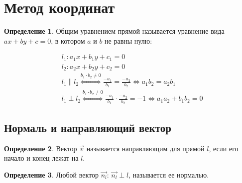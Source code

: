 \documentclass[12pt]{article}
\theoremstyle{definition}
\newtheorem{definition}{Определение}
\begin{document}
    \section{Метод координат}

    \begin{definition}
        Общим уравнением прямой называется уравнение вида $ax+by+c=0$, в котором $a$ и $b$ не равны нулю:

        \begin{align*}
            &l_1:a_1x+b_1y+c_1=0\\
            &l_2:a_2x+b_2y+c_2=0\\
            &l_1\|l_2 \overset{b_1\cdot b_2\neq 0}{\Longleftrightarrow} \frac{-a_1}{b_1}=\frac{-a_2}{b_2}\Longleftrightarrow a_1b_2=a_2b_1\\
            &l_1\perp l_2 \overset{b_1\cdot b_2\neq 0}{\Longleftrightarrow} \frac{-a_1}{b_1}\cdot \frac{-a_2}{b_2}=-1 \Longleftrightarrow a_1a_2+b_1b_2=0
        \end{align*}
    \end{definition}

    \subsection{Нормаль и направляющий вектор}

    \begin{definition}
        Вектор $\Vec{\textit{v}}$ называется направляющим для прямой $l$, если его начало и конец лежат на $l$.
    \end{definition}

    \begin{definition}
        Любой вектор $\Vec{n_l}:\, \Vec{n_l}\perp l$, называется ее нормалью.
    \end{definition}
\end{document}
